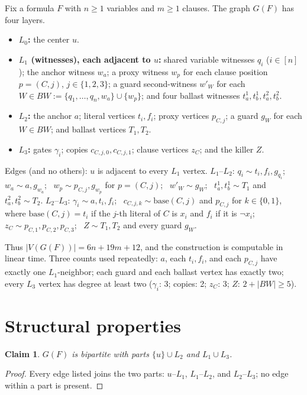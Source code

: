 \documentclass[11pt]{article}
\newtheorem{claim}[theorem]{Claim}
\newcommand{\BW}{\mathit{BW}}
\begin{document}
Fix a formula $F$ with $n \ge 1$ variables and $m \ge 1$ clauses. The
graph $G(F)$ has four layers.

\begin{itemize}
\item \textbf{$L_0$:} the center $u$.
\item \textbf{$L_1$ (witnesses), each adjacent to $u$:}
  shared variable witnesses $q_i$ ($i \in [n]$); the anchor witness
  $w_a$; a proxy witness $w_p$ for each clause position
  $p = (C,j)$, $j \in \{1,2,3\}$; a guard second-witness $w'_W$ for
  each $W \in \BW := \{q_1,\dots,q_n, w_a\} \cup \{w_p\}$; and four
  ballast witnesses $t^1_a, t^1_b, t^2_a, t^2_b$.
\item \textbf{$L_2$:} the anchor $a$; literal vertices $t_i, f_i$;
  proxy vertices $p_{C,j}$; a guard $g_W$ for each $W \in \BW$; and
  ballast vertices $T_1, T_2$.
\item \textbf{$L_3$:} gates $\gamma_i$; copies $c_{C,j,0}, c_{C,j,1}$;
  clause vertices $z_C$; and the killer $Z$.
\end{itemize}

Edges (and no others): $u$ is adjacent to every $L_1$ vertex.
$L_1$--$L_2$: $q_i \sim t_i, f_i, g_{q_i}$; \ $w_a \sim a, g_{w_a}$;
\ $w_p \sim p_{C,j}, g_{w_p}$ for $p=(C,j)$; \ $w'_W \sim g_W$; \
$t^1_a, t^1_b \sim T_1$ and $t^2_a, t^2_b \sim T_2$.
$L_2$--$L_3$: $\gamma_i \sim a, t_i, f_i$; \ $c_{C,j,k} \sim
\mathrm{base}(C,j)$ and $p_{C,j}$ for $k \in \{0,1\}$, where
$\mathrm{base}(C,j) = t_i$ if the $j$-th literal of $C$ is $x_i$ and
$f_i$ if it is $\lnot x_i$; \ $z_C \sim p_{C,1}, p_{C,2}, p_{C,3}$;
\ $Z \sim T_1, T_2$ and every guard $g_W$.

Thus $|V(G(F))| = 6n + 19m + 12$, and the construction is computable
in linear time. Three counts used repeatedly: $a$, each $t_i, f_i$,
and each $p_{C,j}$ have exactly one $L_1$-neighbor; each guard and
each ballast vertex has exactly two; every $L_3$ vertex has degree at
least two ($\gamma_i$: 3; copies: 2; $z_C$: 3; $Z$: $2 + |\BW| \ge
5$).

\section{Structural properties}\label{sec:structure}

\begin{claim}\label{cl:bip}
$G(F)$ is bipartite with parts $\{u\} \cup L_2$ and $L_1 \cup L_3$.
\end{claim}
\begin{proof}
Every edge listed joins the two parts: $u$--$L_1$, $L_1$--$L_2$, and
$L_2$--$L_3$; no edge within a part is present.
\end{proof}
\end{document}

